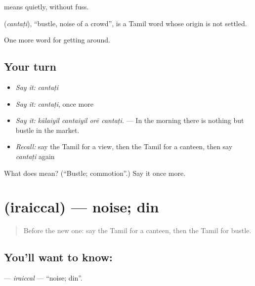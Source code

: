   means quietly, without fuss.

\begin{cousinweb}
\textbf{} (\emph{cantaṭi}), \textquotedblleft{}bustle, noise of a crowd\textquotedblright{}, is a Tamil word whose origin is not settled.
\end{cousinweb}

\begin{grammarlens}[title={What you've built}]
One more word for getting around.
\end{grammarlens}

\subsection*{Your turn}
\begin{itemize}
\raggedright
  \item \emph{Say it:} \emph{cantaṭi}
  \item \emph{Say it:} \emph{cantaṭi}, once more
  \item \emph{Say it:} \emph{kālaiyil cantaiyil orē cantaṭi.} — In the morning there is nothing but bustle in the market.
  \item \emph{Recall:} say the Tamil for a view, then the Tamil for a canteen, then say \emph{cantaṭi} again
\end{itemize}

\begin{tcolorbox}[breakable,colback=teal!4,colframe=teal!35!black,title={Before you move on}]
What does  mean? (\textquotedblleft{}Bustle; commotion\textquotedblright{}.) Say it once more.
\end{tcolorbox}
\section[\texorpdfstring{\ta{இரைச்சல்} (iraiccal)}{இரைச்சல் (iraiccal)}]{ (iraiccal) — noise; din}

\label{lesson:TA-C426-iraiccal}



\begin{quote}
Before the new one: say the Tamil for a canteen, then the Tamil for bustle.
\end{quote}

\subsection*{You'll want to know: }
\textbf{} — \emph{iraiccal} — \textquotedblleft{}noise; din\textquotedblright{}.

